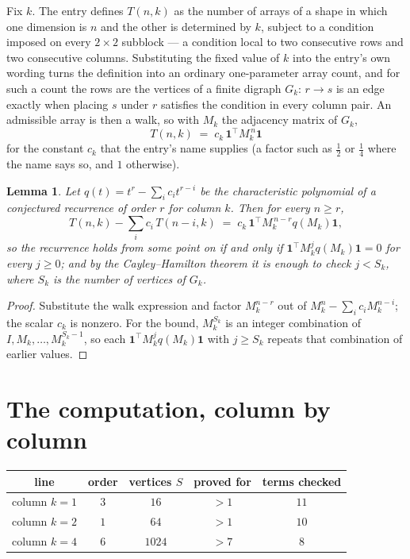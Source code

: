 \documentclass[11pt,a4paper]{article}
\theoremstyle{plain}
\newtheorem{lemma}[theorem]{Lemma}
\theoremstyle{definition}
\begin{document}
Fix $k$. The entry defines $T(n,k)$ as the number of arrays of a shape in which one dimension
is $n$ and the other is determined by $k$, subject to a condition imposed on every
$2\times2$ subblock --- a condition local to two consecutive rows and two consecutive columns.
Substituting the fixed value of $k$ into the entry's own wording turns the definition into an
ordinary one-parameter array count, and for such a count the rows are the vertices of a finite
digraph $G_k$: $r\to s$ is an edge exactly when placing $s$ under $r$ satisfies the condition
in every column pair. An admissible array is then a walk, so with $M_k$ the adjacency matrix
of $G_k$,
\[
T(n,k)\;=\;c_k\,\mathbf{1}^{\!\top}M_k^{\,n}\mathbf{1}
\]
for the constant $c_k$ that the entry's name supplies (a factor such as $\tfrac12$ or
$\tfrac14$ where the name says so, and $1$ otherwise).

\begin{lemma}\label{lem:crit}
Let $q(t)=t^{r}-\sum_i c_it^{r-i}$ be the characteristic polynomial of a conjectured
recurrence of order $r$ for column $k$. Then for every $n\ge r$,
\[
T(n,k)-\sum_i c_i\,T(n-i,k)\;=\;c_k\,\mathbf{1}^{\!\top}M_k^{\,n-r}q(M_k)\mathbf{1},
\]
so the recurrence holds from some point on if and only if
$\mathbf{1}^{\!\top}M_k^{j}q(M_k)\mathbf{1}=0$ for every $j\ge0$; and by the
Cayley--Hamilton theorem it is enough to check $j<S_k$, where $S_k$ is the number of vertices
of $G_k$.
\end{lemma}

\begin{proof}
Substitute the walk expression and factor $M_k^{n-r}$ out of $M_k^{n}-\sum_ic_iM_k^{n-i}$;
the scalar $c_k$ is nonzero. For the bound, $M_k^{S_k}$ is an integer combination of
$I,M_k,\dots,M_k^{S_k-1}$, so each $\mathbf{1}^{\!\top}M_k^{j}q(M_k)\mathbf{1}$ with
$j\ge S_k$ repeats that combination of earlier values.
\end{proof}

\section{The computation, column by column}

\begin{center}
\begin{tabular}{ccccc}
line & order & vertices $S$ & proved for & terms checked \\ \hline
column $k$$=1$ & $3$ & $16$ & $>1$ & $11$ \\
column $k$$=2$ & $1$ & $64$ & $>1$ & $10$ \\
column $k$$=4$ & $6$ & $1024$ & $>7$ & $8$ \\
\end{tabular}
\end{center}
\end{document}
